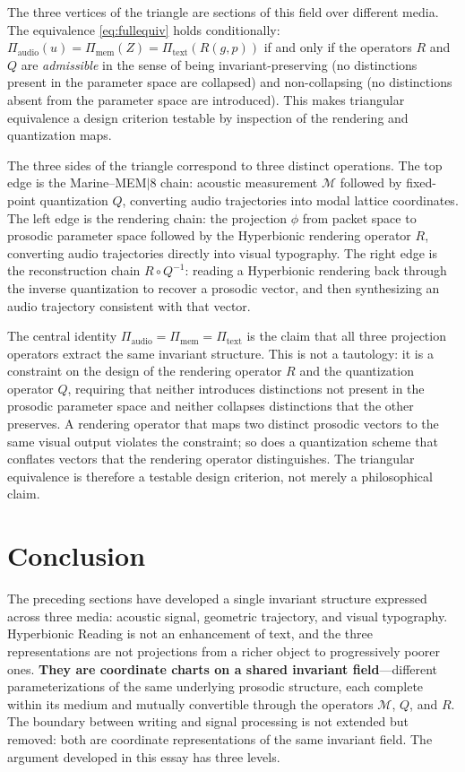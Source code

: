 \documentclass[12pt, a4paper]{article}
\newcommand{\hyperstrong}[1]{\textbf{\Large #1}}
\begin{document}
The three vertices of the triangle are sections of this field over different media. The equivalence \eqref{eq:fullequiv} holds conditionally: $\Pi_{\mathrm{audio}}(u) = \Pi_{\mathrm{mem}}(Z) = \Pi_{\mathrm{text}}(R(g,p))$ if and only if the operators $R$ and $Q$ are \emph{admissible} in the sense of being invariant-preserving (no distinctions present in the parameter space are collapsed) and non-collapsing (no distinctions absent from the parameter space are introduced). This makes triangular equivalence a design criterion testable by inspection of the rendering and quantization maps.

The three sides of the triangle correspond to three distinct operations. The top edge is the Marine--MEM$|$8 chain: acoustic measurement $\mathcal{M}$ followed by fixed-point quantization $Q$, converting audio trajectories into modal lattice coordinates. The left edge is the rendering chain: the projection $\phi$ from packet space to prosodic parameter space followed by the Hyperbionic rendering operator $R$, converting audio trajectories directly into visual typography. The right edge is the reconstruction chain $R \circ Q^{-1}$: reading a Hyperbionic rendering back through the inverse quantization to recover a prosodic vector, and then synthesizing an audio trajectory consistent with that vector.

The central identity $\Pi_{\mathrm{audio}} = \Pi_{\mathrm{mem}} = \Pi_{\mathrm{text}}$ is the claim that all three projection operators extract the same invariant structure. This is not a tautology: it is a constraint on the design of the rendering operator $R$ and the quantization operator $Q$, requiring that neither introduces distinctions not present in the prosodic parameter space and neither collapses distinctions that the other preserves. A rendering operator that maps two distinct prosodic vectors to the same visual output violates the constraint; so does a quantization scheme that conflates vectors that the rendering operator distinguishes. The triangular equivalence is therefore a testable design criterion, not merely a philosophical claim.


\section{Conclusion}

The preceding sections have developed a single invariant structure expressed across three media: acoustic signal, geometric trajectory, and visual typography. Hyperbionic Reading is not an enhancement of text, and the three representations are not projections from a richer object to progressively poorer ones. \hyperstrong{They are coordinate charts on a shared invariant field}---different parameterizations of the same underlying prosodic structure, each complete within its medium and mutually convertible through the operators $\mathcal{M}$, $Q$, and $R$. The boundary between writing and signal processing is not extended but removed: both are coordinate representations of the same invariant field. The argument developed in this essay has three levels.
\end{document}
